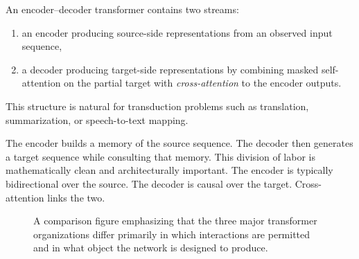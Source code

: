 \begin{definition}
An encoder--decoder transformer contains two streams:
\begin{enumerate}
    \item an encoder producing source-side representations from an observed input sequence,
    \item a decoder producing target-side representations by combining masked self-attention on the partial target with \emph{cross-attention} to the encoder outputs.
\end{enumerate}
This structure is natural for transduction problems such as translation, summarization, or speech-to-text mapping.
\end{definition}

The encoder builds a memory of the source sequence.
The decoder then generates a target sequence while consulting that memory.
This division of labor is mathematically clean and architecturally important.
The encoder is typically bidirectional over the source.
The decoder is causal over the target.
Cross-attention links the two.

\begin{figure}[h]
\centering
{}
\caption{A comparison figure emphasizing that the three major transformer organizations differ primarily in which interactions are permitted and in what object the network is designed to produce.}
\end{figure}

